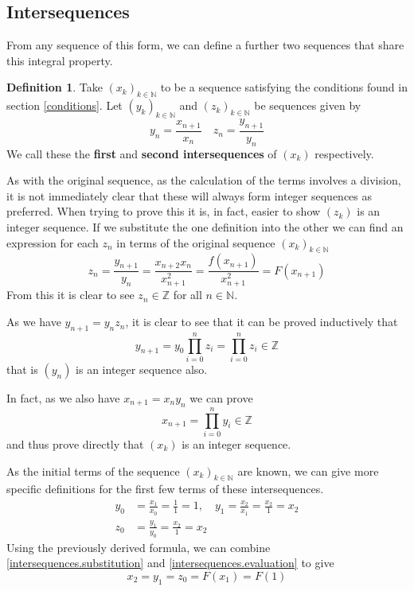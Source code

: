 \documentclass{article}
\theoremstyle{remark}
\theoremstyle{definition}
\newtheorem{definition}{Definition}[section]
\begin{document}
\subsection{Intersequences}\label{intersequences}
From any sequence of this form, we can define a further two sequences that share this integral property.
\begin{definition}\label{intersequences.definition}
Take $(x_k)_{k\in\mathbb{N}}$ to be a sequence satisfying the conditions found in section \ref{conditions}. Let $(y_k)_{k\in\mathbb{N}}$ and $(z_k)_{k\in\mathbb{N}}$ be sequences given by
\begin{equation}
    y_n = \frac{x_{n+1}}{x_n} \quad z_n = \frac{y_{n+1}}{y_n}
\end{equation}
We call these the \textbf{first} and \textbf{second intersequences} of $(x_k)$ respectively.
\end{definition}
As with the original sequence, as the calculation of the terms involves a division, it is not immediately clear that these will always form integer sequences as preferred. When trying to prove this it is, in fact, easier to show $(z_k)$ is an integer sequence. If we substitute the one definition into the other we can find an expression for each $z_n$ in terms of the original sequence $(x_k)_{k\in\mathbb{N}}$
\begin{equation}\label{intersequences.substitution}
    z_n = \frac{y_{n+1}}{y_n} = \frac{x_{n+2} x_n}{x_{n+1}^2} = \frac{f(x_{n+1})}{x_{n+1}^2} = F(x_{n+1})
\end{equation}
From this it is clear to see $z_n \in \mathbb{Z}$ for all $n \in \mathbb{N}$.

As we have $y_{n+1} = y_n z_n$, it is clear to see that it can be proved inductively that
\begin{equation}
    y_{n+1} = y_0 \prod_{i=0}^{n} z_i = \prod_{i=0}^{n} z_i \in \mathbb{Z}
\end{equation}
that is $(y_n)$ is an integer sequence also.

In fact, as we also have $x_{n+1} = x_n y_n$ we can prove
\begin{equation}\label{intersequences.yproduct}
    x_{n+1} = \prod_{i=0}^n y_i \in \mathbb{Z}
\end{equation}
and thus prove directly that $(x_k)$ is an integer sequence.

As the initial terms of the sequence $(x_k)_{k\in\mathbb{N}}$ are known, we can give more specific definitions for the first few terms of these intersequences.
\begin{equation}\label{intersequences.evaluation}
\begin{split}
    y_0 &= \frac{x_1}{x_0} = \frac{1}{1} = 1, \quad y_1 = \frac{x_2}{x_1} = \frac{x_2}{1} = x_2 \\
    z_0 &= \frac{y_1}{y_0} = \frac{x_2}{1} = x_2
\end{split}
\end{equation}
Using the previously derived formula, we can combine \eqref{intersequences.substitution} and \eqref{intersequences.evaluation} to give
\begin{equation}\label{intersequences.combination}
    x_2 = y_1 = z_0 = F(x_1) = F(1)
\end{equation}
\end{document}
